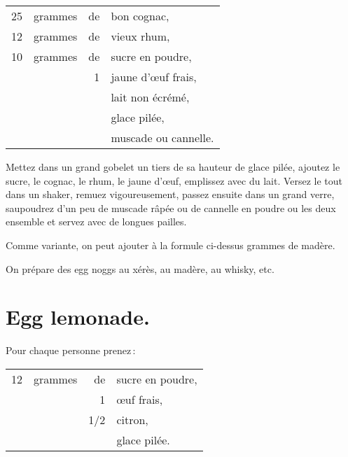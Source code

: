 \footnotesize
\begin{longtable}{rrrp{16em}}
     25 & grammes & de & bon cognac,                                                                      \\
     12 & grammes & de & vieux rhum,                                                                      \\
     10 & grammes & de & sucre en poudre,                                                                 \\
        &         &  1 & jaune d'œuf frais,                                                               \\
        &         &    & lait non écrémé,                                                                 \\
        &         &    & glace pilée,                                                                     \\
        &         &    & muscade ou cannelle.                                                             \\
\end{longtable}
\normalsize

Mettez dans un grand gobelet un tiers de sa hauteur de glace pilée, ajoutez le
sucre, le cognac, le rhum, le jaune d'œuf, emplissez avec du lait. Versez le
tout dans un shaker, remuez vigoureusement, passez ensuite dans un grand verre,
saupoudrez d'un peu de muscade râpée ou de cannelle en poudre ou les deux
ensemble et servez avec de longues pailles.

\sk

Comme variante, on peut ajouter à la formule ci-dessus {\mmm} grammes de
madère.

\sk

On prépare des egg noggs au xérès, au madère, au whisky, etc.

\section*{\centering Egg lemonade.}
{}

Pour chaque personne prenez :

\footnotesize
\begin{longtable}{rrrp{16em}}
     12 & grammes &  de & sucre en poudre,                                                                \\
        &         &   1 & œuf frais,                                                                      \\
        &         & 1/2 & citron,                                                                         \\
        &         &     & glace pilée.                                                                    \\
\end{longtable}
\normalsize

